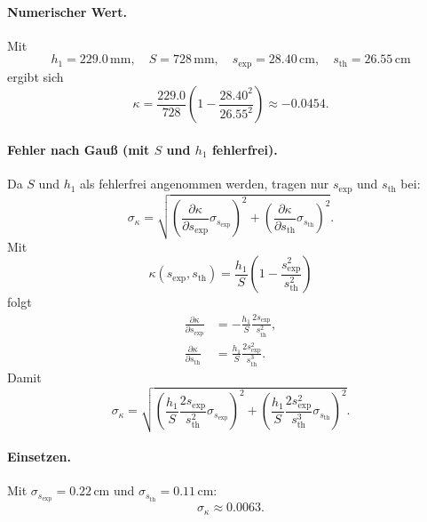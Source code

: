 \documentclass{article}
\begin{document}
\paragraph{Numerischer Wert.}
Mit
\[
h_1=229.0\,\mathrm{mm},\quad S=728\,\mathrm{mm},\quad
s_\mathrm{exp}=28.40\,\mathrm{cm},\quad s_\mathrm{th}=26.55\,\mathrm{cm}
\]
ergibt sich
\begin{equation}
\kappa
=\frac{229.0}{728}\left(1-\frac{28.40^2}{26.55^2}\right)
\approx -0.0454.
\end{equation}

\paragraph{Fehler nach Gau{\ss} (mit \texorpdfstring{$S$}{S} und \texorpdfstring{$h_1$}{h1} fehlerfrei).}
Da \(S\) und \(h_1\) als fehlerfrei angenommen werden, tragen nur \(s_\mathrm{exp}\) und \(s_\mathrm{th}\) bei:
\begin{equation}
\sigma_\kappa=
\sqrt{
\left(\frac{\partial \kappa}{\partial s_\mathrm{exp}}\sigma_{s_\mathrm{exp}}\right)^2
+
\left(\frac{\partial \kappa}{\partial s_\mathrm{th}}\sigma_{s_\mathrm{th}}\right)^2}.
\end{equation}
Mit
\begin{equation}
\kappa(s_\mathrm{exp},s_\mathrm{th})
=\frac{h_1}{S}\left(1-\frac{s_\mathrm{exp}^2}{s_\mathrm{th}^2}\right)
\end{equation}
folgt
\begin{align}
\frac{\partial \kappa}{\partial s_\mathrm{exp}}
&=
-\frac{h_1}{S}\frac{2s_\mathrm{exp}}{s_\mathrm{th}^2},\\[4pt]
\frac{\partial \kappa}{\partial s_\mathrm{th}}
&=
\frac{h_1}{S}\frac{2s_\mathrm{exp}^2}{s_\mathrm{th}^3}.
\end{align}
Damit
\begin{equation}
\sigma_\kappa=
\sqrt{
\left(\frac{h_1}{S}\frac{2s_\mathrm{exp}}{s_\mathrm{th}^2}\sigma_{s_\mathrm{exp}}\right)^2
+
\left(\frac{h_1}{S}\frac{2s_\mathrm{exp}^2}{s_\mathrm{th}^3}\sigma_{s_\mathrm{th}}\right)^2}.
\end{equation}

\paragraph{Einsetzen.}
Mit \(\sigma_{s_\mathrm{exp}}=0.22\,\mathrm{cm}\) und \(\sigma_{s_\mathrm{th}}=0.11\,\mathrm{cm}\):
\begin{equation}
\sigma_\kappa\approx 0.0063.
\end{equation}
\end{document}
